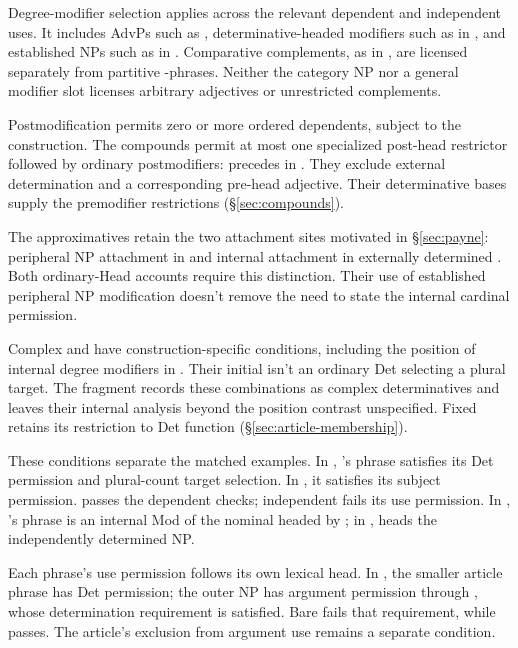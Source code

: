 \documentclass[12pt]{article}
\begin{document}
Degree-modifier selection applies across the relevant dependent and independent uses. It includes AdvPs such as , determinative-headed modifiers such as  in , and established NPs such as  in . Comparative complements, as in , are licensed separately from partitive -phrases. Neither the category NP nor a general modifier slot licenses arbitrary adjectives or unrestricted complements.

Postmodification permits zero or more ordered dependents, subject to the construction. The compounds permit at most one specialized post-head restrictor followed by ordinary postmodifiers:  precedes  in . They exclude external determination and a corresponding pre-head adjective. Their determinative bases supply the premodifier restrictions (§\ref{sec:compounds}).

The approximatives retain the two attachment sites motivated in §\ref{sec:payne}: peripheral NP attachment in  and internal attachment in externally determined . Both ordinary-Head accounts require this distinction. Their use of established peripheral NP modification doesn't remove the need to state the internal cardinal permission.

Complex  and  have construction-specific conditions, including the position of internal degree modifiers in . Their initial  isn't an ordinary Det selecting a plural  target. The fragment records these combinations as complex determinatives and leaves their internal analysis beyond the position contrast unspecified. Fixed  retains its restriction to Det function (§\ref{sec:article-membership}).

These conditions separate the matched examples. In , 's phrase satisfies its Det permission and plural-count target selection. In , it satisfies its subject permission.  passes the dependent checks; independent  fails its use permission. In , 's phrase is an internal Mod of the nominal headed by ; in ,  heads the independently determined NP.

Each phrase's use permission follows its own lexical head. In , the smaller article phrase has Det permission; the outer NP has argument permission through , whose determination requirement is satisfied. Bare  fails that requirement, while  passes. The article's exclusion from argument use remains a separate condition.
\end{document}
